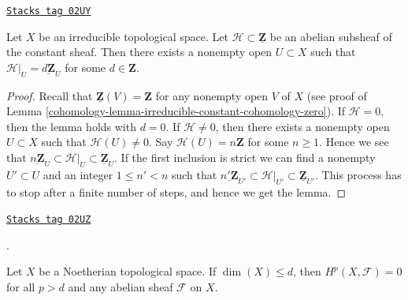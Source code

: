 \begin{lemma}
\label{cohomology-lemma-subsheaf-irreducible}
\href{https://stacks.math.columbia.edu/tag/02UY}{\texttt{Stacks tag 02UY}}

Let $X$ be an irreducible topological space.
Let $\mathcal{H} \subset \underline{\mathbf{Z}}$ be
an abelian subsheaf of the constant sheaf.
Then there exists a nonempty open $U \subset X$ such
that $\mathcal{H}|_U = \underline{d\mathbf{Z}}_U$
for some $d \in \mathbf{Z}$.
\end{lemma}

\begin{proof}

Recall that $\underline{\mathbf{Z}}(V) = \mathbf{Z}$
for any nonempty open $V$ of $X$ (see proof of
Lemma \ref{cohomology-lemma-irreducible-constant-cohomology-zero}).
If $\mathcal{H} = 0$, then the lemma holds with $d = 0$.
If $\mathcal{H} \not = 0$, then there exists a nonempty open
$U \subset X$ such that $\mathcal{H}(U) \not = 0$.
Say $\mathcal{H}(U) = n\mathbf{Z}$ for some $n \geq 1$.
Hence we see that
$\underline{n\mathbf{Z}}_U
\subset \mathcal{H}|_U \subset
\underline{\mathbf{Z}}_U$. If the first inclusion is strict we
can find a nonempty $U' \subset U$ and an integer $1 \leq n' < n$
such that
$\underline{n'\mathbf{Z}}_{U'}
\subset \mathcal{H}|_{U'} \subset
\underline{\mathbf{Z}}_{U'}$.
This process has to stop after a finite number of steps, and
hence we get the lemma.
\end{proof}

\begin{proposition}[Grothendieck]

\label{cohomology-proposition-vanishing-Noetherian}
\href{https://stacks.math.columbia.edu/tag/02UZ}{\texttt{Stacks tag 02UZ}}

\begin{reference}
\cite[Theorem 3.6.5]{Tohoku}.
\end{reference}
Let $X$ be a Noetherian topological space.
If $\dim(X) \leq d$, then $H^p(X, \mathcal{F}) = 0$
for all $p > d$ and any abelian sheaf $\mathcal{F}$
on $X$.
\end{proposition}

